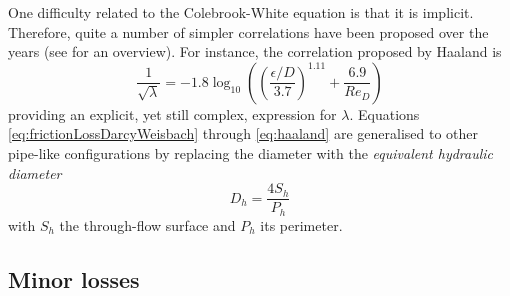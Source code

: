 One difficulty related to the Colebrook-White equation is that it is
implicit. Therefore, quite a number of simpler correlations have been
proposed over the years (see \cite{wikipedia_darcy} for an
overview). For instance, the correlation proposed by Haaland is
\begin{equation}
  \frac{1}{\sqrt{\lambda}} = - 1.8
  \log_{10}\left(\left(\frac{\epsilon/D}{3.7}\right)^{1.11} +
    \frac{6.9}{Re_D}\right)
    \label{eq:haaland}
\end{equation}
providing an explicit, yet still complex, expression for $\lambda$.
Equations \ref{eq:frictionLossDarcyWeisbach} through
\ref{eq:haaland} are generalised to other pipe-like
configurations by replacing the diameter with the \emph{equivalent
  hydraulic diameter}
\begin{equation}
  D_h = \frac{4 S_h}{P_h}
\end{equation}
with $S_h$ the through-flow surface and $P_h$ its perimeter.
 
\subsection{Minor losses}

